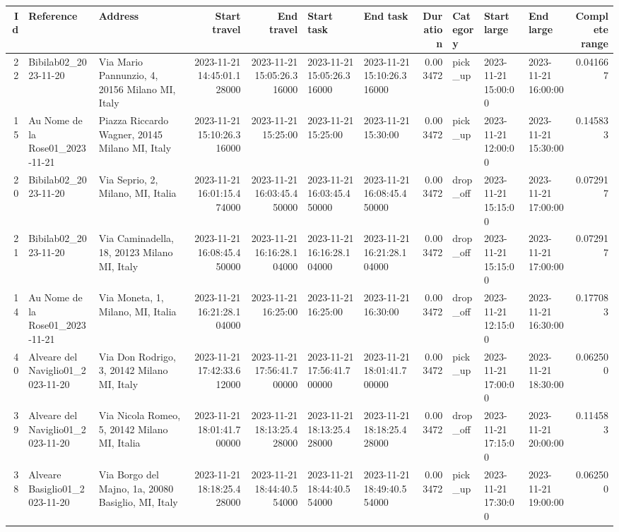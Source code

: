 \documentclass[titlepage]{article}
\begin{document}
\begin{table}[H]
\centering
\begin{adjustbox}{max width=\textwidth}
\begin{tabular}{rllrrllrlllr}
\toprule
Id & Reference & Address & Start travel & End travel & Start task & End task & Duration & Category & Start large & End large & Complete range \\
\midrule
22 & Bibilab02\_2023-11-20 & Via Mario Pannunzio, 4, 20156 Milano MI, Italy & 2023-11-21 14:45:01.128000 & 2023-11-21 15:05:26.316000 & 2023-11-21 15:05:26.316000 & 2023-11-21 15:10:26.316000 & 0.003472 & pick\_up & 2023-11-21 15:00:00 & 2023-11-21 16:00:00 & 0.041667 \\
15 & Au Nome de la Rose01\_2023-11-21 & Piazza Riccardo Wagner, 20145 Milano MI, Italy & 2023-11-21 15:10:26.316000 & 2023-11-21 15:25:00 & 2023-11-21 15:25:00 & 2023-11-21 15:30:00 & 0.003472 & pick\_up & 2023-11-21 12:00:00 & 2023-11-21 15:30:00 & 0.145833 \\
20 & Bibilab02\_2023-11-20 & Via Seprio, 2, Milano, MI, Italia & 2023-11-21 16:01:15.474000 & 2023-11-21 16:03:45.450000 & 2023-11-21 16:03:45.450000 & 2023-11-21 16:08:45.450000 & 0.003472 & drop\_off & 2023-11-21 15:15:00 & 2023-11-21 17:00:00 & 0.072917 \\
21 & Bibilab02\_2023-11-20 & Via Caminadella, 18, 20123 Milano MI, Italy & 2023-11-21 16:08:45.450000 & 2023-11-21 16:16:28.104000 & 2023-11-21 16:16:28.104000 & 2023-11-21 16:21:28.104000 & 0.003472 & drop\_off & 2023-11-21 15:15:00 & 2023-11-21 17:00:00 & 0.072917 \\
14 & Au Nome de la Rose01\_2023-11-21 & Via Moneta, 1, Milano, MI, Italia & 2023-11-21 16:21:28.104000 & 2023-11-21 16:25:00 & 2023-11-21 16:25:00 & 2023-11-21 16:30:00 & 0.003472 & drop\_off & 2023-11-21 12:15:00 & 2023-11-21 16:30:00 & 0.177083 \\
40 & Alveare del Naviglio01\_2023-11-20 & Via Don Rodrigo, 3, 20142 Milano MI, Italy & 2023-11-21 17:42:33.612000 & 2023-11-21 17:56:41.700000 & 2023-11-21 17:56:41.700000 & 2023-11-21 18:01:41.700000 & 0.003472 & pick\_up & 2023-11-21 17:00:00 & 2023-11-21 18:30:00 & 0.062500 \\
39 & Alveare del Naviglio01\_2023-11-20 & Via Nicola Romeo, 5, 20142 Milano MI, Italia & 2023-11-21 18:01:41.700000 & 2023-11-21 18:13:25.428000 & 2023-11-21 18:13:25.428000 & 2023-11-21 18:18:25.428000 & 0.003472 & drop\_off & 2023-11-21 17:15:00 & 2023-11-21 20:00:00 & 0.114583 \\
38 & Alveare Basiglio01\_2023-11-20 & Via Borgo del Majno, 1a, 20080 Basiglio, MI, Italy & 2023-11-21 18:18:25.428000 & 2023-11-21 18:44:40.554000 & 2023-11-21 18:44:40.554000 & 2023-11-21 18:49:40.554000 & 0.003472 & pick\_up & 2023-11-21 17:30:00 & 2023-11-21 19:00:00 & 0.062500 \\

\end{tabular}
\end{adjustbox}
\end{table}
\end{document}
